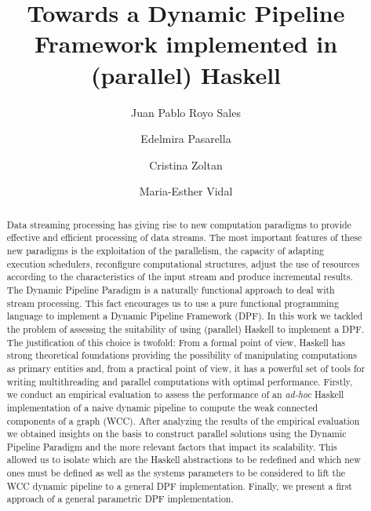 \documentclass[preprint]{elsarticle}
\title{Towards a Dynamic Pipeline Framework implemented in (parallel) Haskell\tnoteref{t1}}
\author[1]{Juan Pablo Royo Sales}
\author[1]{Edelmira Pasarella}
\author[1]{Cristina Zoltan}
\author[2]{Maria-Esther Vidal}
\affiliation[1]{organization={Universitat Politecnica de Catalunya},
postcode={08034},
city={Barcelona},
country={Spain}}
\affiliation[2]{organization={TIB/L3S Research Centre at the University of Hannover},
city={Hannover},
country={Germany}}
\begin{document}
\begin{abstract}
Data streaming processing has giving rise to new computation paradigms to provide effective and efficient processing of data streams. The most important features of these new paradigms is the exploitation of  the parallelism, the capacity of adapting execution schedulers, reconfigure computational structures, adjust the use of resources according to the characteristics of the input stream and produce incremental results. The Dynamic Pipeline Paradigm is a naturally functional approach to deal with stream processing. This fact encourages us to use a  pure functional programming language to implement a Dynamic Pipeline Framework (DPF).  In this work we tackled the problem of assessing the suitability of using (parallel) Haskell to implement a DPF.  The justification of this choice is twofold: From a formal point of view, Haskell has strong theoretical foundations providing the possibility of manipulating computations as primary entities and, from a practical point of view,  it has a powerful set of tools for writing multithreading and parallel computations with optimal performance. Firstly, we conduct an empirical evaluation to assess the performance of an \textit{ad-hoc} Haskell implementation of a naive dynamic pipeline to compute  the weak connected components of a graph (WCC).  After analyzing the results of the empirical evaluation we obtained insights on  the basis to construct parallel solutions using the Dynamic Pipeline Paradigm and the more relevant  factors that impact its scalability.  This allowed us to isolate which are the Haskell abstractions to be redefined and which new ones must be defined as well as the systems parameters to be considered to lift the WCC dynamic pipeline to a general  DPF implementation. Finally, we present a first approach of a general parametric DPF implementation.

\end{abstract}
\end{document}

